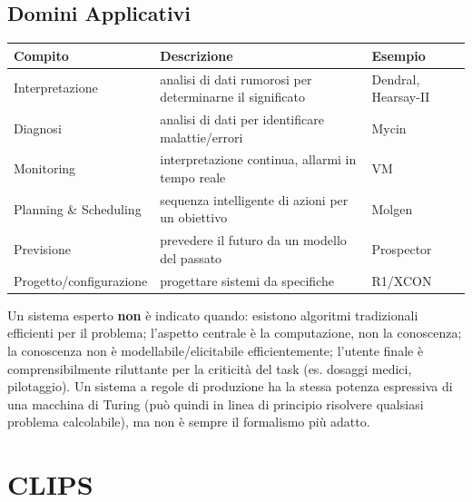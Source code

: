 \documentclass[a4paper,11pt]{article}
\begin{document}
\subsection{Domini Applicativi}

\begin{center}
\small
\begin{tabular}{lll}
\toprule
\textbf{Compito} & \textbf{Descrizione} & \textbf{Esempio} \\
\midrule
Interpretazione & analisi di dati rumorosi per determinarne il significato & Dendral, Hearsay-II \\
Diagnosi & analisi di dati per identificare malattie/errori & Mycin \\
Monitoring & interpretazione continua, allarmi in tempo reale & VM \\
Planning \& Scheduling & sequenza intelligente di azioni per un obiettivo & Molgen \\
Previsione & prevedere il futuro da un modello del passato & Prospector \\
Progetto/configurazione & progettare sistemi da specifiche & R1/XCON \\
\bottomrule
\end{tabular}
\end{center}

Un sistema esperto \textbf{non} è indicato quando: esistono algoritmi tradizionali efficienti per il problema; l'aspetto centrale è la computazione, non la conoscenza; la conoscenza non è modellabile/elicitabile efficientemente; l'utente finale è comprensibilmente riluttante per la criticità del task (es. dosaggi medici, pilotaggio). Un sistema a regole di produzione ha la stessa potenza espressiva di una macchina di Turing (può quindi in linea di principio risolvere qualsiasi problema calcolabile), ma non è sempre il formalismo più adatto.

\newpage
\section{CLIPS}
\end{document}
